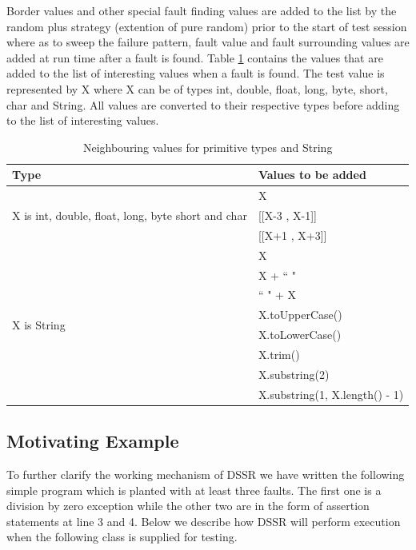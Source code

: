 \documentclass[10pt, conference, compsocconf]{IEEEtran}
\begin{document}
Border values and other special fault finding values are added to the list by the random plus strategy (extention of pure random) prior to the start of test session where as to sweep the failure pattern, fault value and fault surrounding values are added at run time after a fault is found. Table \ref{table:addvalues} contains the values that are added to the list of interesting values when a fault is found. The test value is represented by X where X can be of types int, double, float, long, byte, short, char and String. All values are converted to their respective types before adding to the list of interesting values.

\begin{table}[ht]
\scriptsize
\caption{Neighbouring values for primitive types and String} %
\centering %
\begin{tabular}{| l | l |} %
\hline\hline %
Type & Values to be added\\ [0.5ex] %
\hline %
\multirow{3}{*}{X is int, double, float, long, byte short and char} & X \\ %

&[[X-3 , X-1]] \\
&[[X+1 , X+3]]\\
\hline
\multirow{8}{*}{X is String} & X\\ %

& X + ``  "\\ %
& ``  " + X \\ %
& X.toUpperCase() \\
& X.toLowerCase() \\
& X.trim() \\
& X.substring(2) \\
& X.substring(1, X.length() - 1) \\[1ex]
\hline
\hline %
\end{tabular}
\label{table:addvalues} %
\end{table}


\subsection{Motivating Example}
To further clarify the working mechanism of DSSR we have written the following simple program which is planted with at least three faults. The first one is a division by zero exception while the other two are in the form of assertion statements at line 3 and 4.  Below we describe how DSSR will perform execution when the following class is supplied for testing.\\
\end{document}
